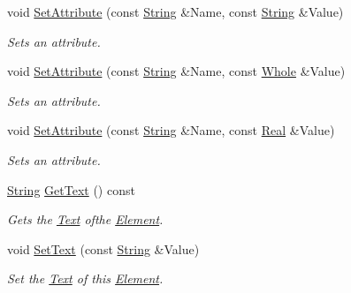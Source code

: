 \begin{DoxyCompactItemize}
void \hyperlink{classphys_1_1xml_1_1Element_a2c6f7670dc0c4b6ea48b30e286b2d770}{SetAttribute} (const \hyperlink{namespacephys_aa03900411993de7fbfec4789bc1d392e}{String} \&Name, const \hyperlink{namespacephys_aa03900411993de7fbfec4789bc1d392e}{String} \&Value)
\begin{DoxyCompactList}\small\item\em Sets an attribute. \item\end{DoxyCompactList}\item 
void \hyperlink{classphys_1_1xml_1_1Element_a7e8337acf9532dc06982bafdbef47c7b}{SetAttribute} (const \hyperlink{namespacephys_aa03900411993de7fbfec4789bc1d392e}{String} \&Name, const \hyperlink{namespacephys_a460f6bc24c8dd347b05e0366ae34f34a}{Whole} \&Value)
\begin{DoxyCompactList}\small\item\em Sets an attribute. \item\end{DoxyCompactList}\item 
void \hyperlink{classphys_1_1xml_1_1Element_a5692ed17666ab79a980b24bb6ea27239}{SetAttribute} (const \hyperlink{namespacephys_aa03900411993de7fbfec4789bc1d392e}{String} \&Name, const \hyperlink{namespacephys_af7eb897198d265b8e868f45240230d5f}{Real} \&Value)
\begin{DoxyCompactList}\small\item\em Sets an attribute. \item\end{DoxyCompactList}\item 
\hyperlink{namespacephys_aa03900411993de7fbfec4789bc1d392e}{String} \hyperlink{classphys_1_1xml_1_1Element_adf1c11072d7062293f81c269cafb9713}{GetText} () const 
\begin{DoxyCompactList}\small\item\em Gets the \hyperlink{classphys_1_1xml_1_1Text}{Text} ofthe \hyperlink{classphys_1_1xml_1_1Element}{Element}. \item\end{DoxyCompactList}\item 
void \hyperlink{classphys_1_1xml_1_1Element_af6b897ccc3ed97bcba3c3ab5fcf6573e}{SetText} (const \hyperlink{namespacephys_aa03900411993de7fbfec4789bc1d392e}{String} \&Value)
\begin{DoxyCompactList}\small\item\em Set the \hyperlink{classphys_1_1xml_1_1Text}{Text} of this \hyperlink{classphys_1_1xml_1_1Element}{Element}. \item\end{DoxyCompactList}\item 

\end{DoxyCompactItemize}
